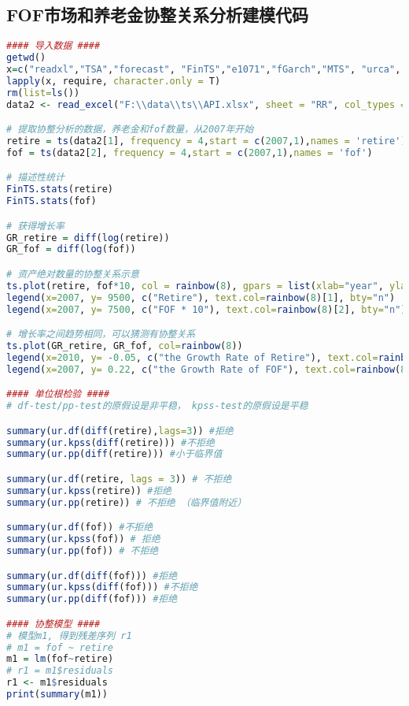 \subsection{FOF市场和养老金协整关系分析建模代码}
\begin{lstlisting}[language=R,frame=single]
#### 导入数据 ####
getwd()
x=c("readxl","TSA","forecast", "FinTS","e1071","fGarch","MTS", "urca", "dynlm")
lapply(x, require, character.only = T)
rm(list=ls())
data2 <- read_excel("F:\\data\\ts\\API.xlsx", sheet = "RR", col_types = c("skip", "skip", "skip", "skip", "numeric", "numeric", "skip"))

# 提取协整分析的数据，养老金和fof数量，从2007年开始
retire = ts(data2[1], frequency = 4,start = c(2007,1),names = 'retire')
fof = ts(data2[2], frequency = 4,start = c(2007,1),names = 'fof')

# 描述性统计
FinTS.stats(retire)
FinTS.stats(fof)

# 获得增长率
GR_retire = diff(log(retire))
GR_fof = diff(log(fof))

# 资产绝对数量的协整关系示意
ts.plot(retire, fof*10, col = rainbow(8), gpars = list(xlab="year", ylab="number" ))
legend(x=2007, y= 9500, c("Retire"), text.col=rainbow(8)[1], bty="n")
legend(x=2007, y= 7500, c("FOF * 10"), text.col=rainbow(8)[2], bty="n")

# 增长率之间趋势相同，可以猜测有协整关系
ts.plot(GR_retire, GR_fof, col=rainbow(8))
legend(x=2010, y= -0.05, c("the Growth Rate of Retire"), text.col=rainbow(8)[1], bty="n")
legend(x=2007, y= 0.22, c("the Growth Rate of FOF"), text.col=rainbow(8)[2], bty="n")

#### 单位根检验 ####
# df-test/pp-test的原假设是非平稳， kpss-test的原假设是平稳

summary(ur.df(diff(retire),lags=3)) #拒绝
summary(ur.kpss(diff(retire))) #不拒绝
summary(ur.pp(diff(retire))) #小于临界值

summary(ur.df(retire, lags = 3)) # 不拒绝
summary(ur.kpss(retire)) #拒绝
summary(ur.pp(retire)) # 不拒绝 （临界值附近）

summary(ur.df(fof)) #不拒绝
summary(ur.kpss(fof)) # 拒绝
summary(ur.pp(fof)) # 不拒绝

summary(ur.df(diff(fof))) #拒绝
summary(ur.kpss(diff(fof))) #不拒绝
summary(ur.pp(diff(fof))) #拒绝

#### 协整模型 ####
# 模型m1, 得到残差序列 r1
# m1 = fof ~ retire
m1 = lm(fof~retire)
# r1 = m1$residuals
r1 <- m1$residuals
print(summary(m1))


\end{lstlisting}
